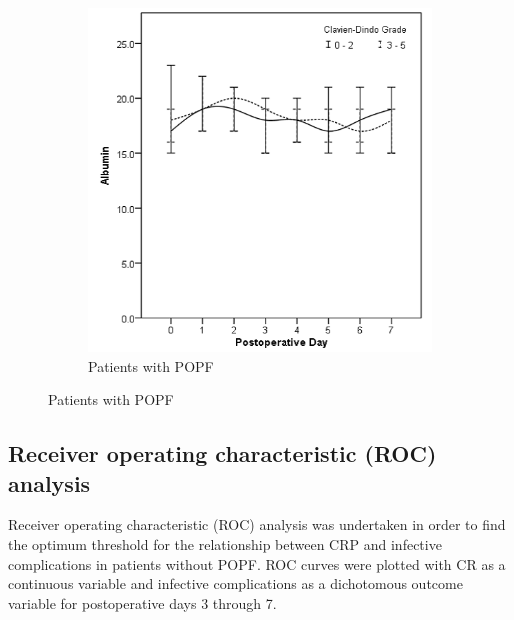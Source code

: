 \begin{figure}[t]
\begin{subfigure}{0.48\textwidth}
		\includegraphics[width=\textwidth]{Figures/crp_comp_Albumin_infective_leak1}
		\caption{Patients with POPF}
		\label{fig:crp_comp_Albumin_infective_leak1}
	\end{subfigure}
\end{figure}
\vfill

\clearpage

\subsection{Receiver operating characteristic (ROC) analysis}
Receiver operating characteristic (ROC) analysis was undertaken in order to find the optimum threshold for the relationship between CRP and infective complications in patients without POPF. 
ROC curves were plotted with CR as a continuous variable and infective complications as a dichotomous outcome variable for postoperative days 3 through 7. 

